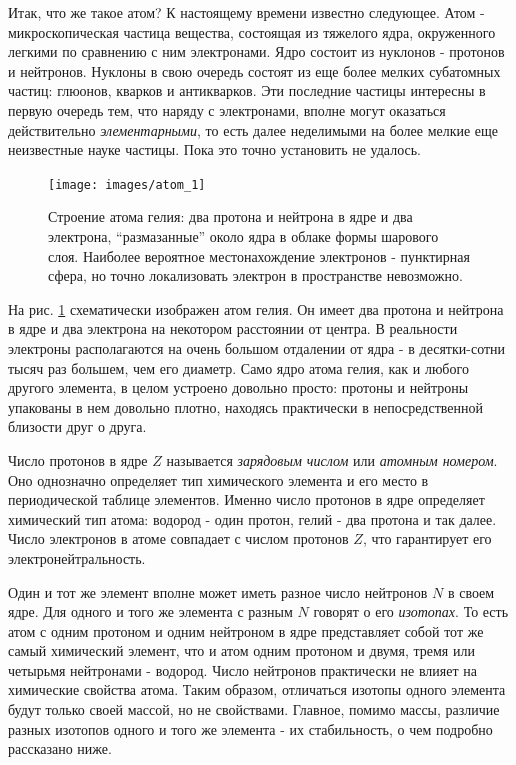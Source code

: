 Итак, что же такое атом? К настоящему времени известно следующее.
Атом - микроскопическая частица вещества, состоящая из тяжелого ядра, окруженного легкими по сравнению с ним электронами.
Ядро состоит из нуклонов - протонов и нейтронов.
Нуклоны в свою очередь состоят из еще более мелких субатомных частиц: глюонов, кварков и антикварков.
Эти последние частицы интересны в первую очередь тем, что наряду с электронами, вполне могут оказаться действительно \textit{элементарными}, то есть далее неделимыми на более мелкие еще неизвестные науке частицы.
Пока это точно установить не удалось.

\begin{figure}[t!]
   \centering
   \texttt{[image: images/atom\_1]}
   \caption{Строение атома гелия: два протона и нейтрона в ядре и два электрона, ``размазанные'' около ядра в облаке формы шарового слоя. Наиболее вероятное местонахождение электронов - пунктирная сфера, но точно локализовать электрон в пространстве невозможно.}
   \label{fig:atom_1}
\end{figure}

На рис. \ref{fig:atom_1} схематически изображен атом гелия.
Он имеет два протона и нейтрона в ядре и два электрона на некотором расстоянии от центра.
В реальности электроны располагаются на очень большом отдалении от ядра - в десятки-сотни тысяч раз большем, чем его диаметр.
Само ядро атома гелия, как и любого другого элемента, в целом устроено довольно просто: протоны и нейтроны упакованы в нем довольно плотно, находясь практически в непосредственной близости друг о друга.

Число протонов в ядре $Z$ называется \textit{зарядовым числом} или \textit{атомным номером}.
Оно однозначно определяет тип химического элемента и его место в периодической таблице элементов.
Именно число протонов в ядре определяет химический тип атома: водород - один протон, гелий - два протона и так далее.
Число электронов в атоме совпадает с числом протонов $Z$, что гарантирует его электронейтральность.

Один и тот же элемент вполне может иметь разное число нейтронов $N$ в своем ядре.
Для одного и того же элемента с разным $N$ говорят о его \textit{изотопах}.
То есть атом с одним протоном и одним нейтроном в ядре представляет собой тот же самый химический элемент, что и атом одним протоном и двумя, тремя или четырьмя нейтронами - водород.
Число нейтронов практически не влияет на химические свойства атома.
Таким образом, отличаться изотопы одного элемента будут только своей массой, но не свойствами.
Главное, помимо массы, различие разных изотопов одного и того же элемента - их стабильность, о чем подробно рассказано ниже.

